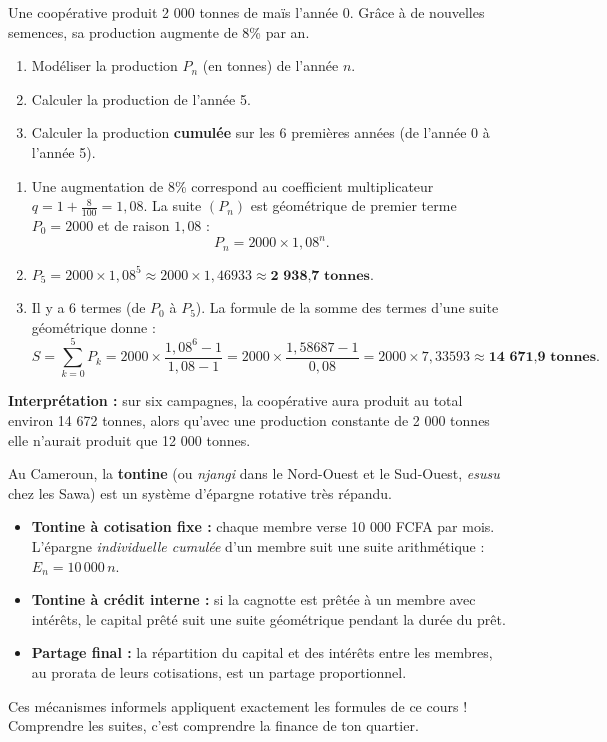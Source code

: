 \documentclass[11pt]{article}
\begin{document}
\begin{exoresolu}
Une coopérative produit 2 000 tonnes de maïs l'année 0. Grâce à de nouvelles semences, sa production augmente de 8\% par an.
\begin{enumerate}
    \item Modéliser la production $P_n$ (en tonnes) de l'année $n$.
    \item Calculer la production de l'année 5.
    \item Calculer la production \textbf{cumulée} sur les 6 premières années (de l'année 0 à l'année 5).
\end{enumerate}
\tcblower
\begin{enumerate}
    \item Une augmentation de 8\% correspond au coefficient multiplicateur $q = 1 + \frac{8}{100} = 1,08$. La suite $(P_n)$ est géométrique de premier terme $P_0 = 2000$ et de raison $1,08$ :
    \[
    P_n = 2000 \times 1,08^n.
    \]
    \item $P_5 = 2000 \times 1,08^5 \approx 2000 \times 1,46933 \approx \textbf{2 938,7 tonnes}$.
    \item Il y a 6 termes (de $P_0$ à $P_5$). La formule de la somme des termes d'une suite géométrique donne :
    \[
    S = \sum_{k=0}^{5} P_k = 2000 \times \frac{1,08^6 - 1}{1,08 - 1} = 2000 \times \frac{1,58687 - 1}{0,08} = 2000 \times 7,33593 \approx \textbf{14 671,9 tonnes}.
    \]
\end{enumerate}
\textbf{Interprétation :} sur six campagnes, la coopérative aura produit au total environ 14 672 tonnes, alors qu'avec une production constante de 2 000 tonnes elle n'aurait produit que 12 000 tonnes.
\end{exoresolu}

\begin{savaistu}
Au Cameroun, la \textbf{tontine} (ou \emph{njangi} dans le Nord-Ouest et le Sud-Ouest, \emph{esusu} chez les Sawa) est un système d'épargne rotative très répandu.
\begin{itemize}
    \item \textbf{Tontine à cotisation fixe :} chaque membre verse 10 000 FCFA par mois. L'épargne \emph{individuelle cumulée} d'un membre suit une suite arithmétique : $E_n = 10\,000\, n$.
    \item \textbf{Tontine à crédit interne :} si la cagnotte est prêtée à un membre avec intérêts, le capital prêté suit une suite géométrique pendant la durée du prêt.
    \item \textbf{Partage final :} la répartition du capital et des intérêts entre les membres, au prorata de leurs cotisations, est un partage proportionnel.
\end{itemize}
Ces mécanismes informels appliquent exactement les formules de ce cours ! Comprendre les suites, c'est comprendre la finance de ton quartier.
\end{savaistu}
\end{document}
